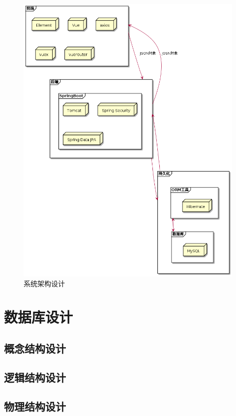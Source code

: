 \begin{figure}[h]
    \centering
    \includegraphics[scale = 0.5]{out/uml/部署图/系统架构/系统架构.png}
    \caption{\song\wuhao 系统架构设计}
    \label{system-frame-deployment}
\end{figure}

\section{数据库设计}
\subsection{概念结构设计}
\subsection{逻辑结构设计}
\subsection{物理结构设计}


